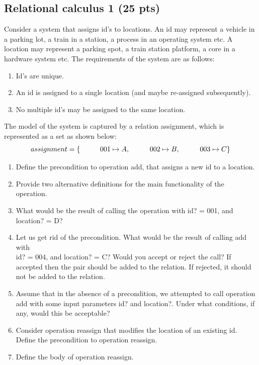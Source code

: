 \documentclass[12pt]{article}
\begin{document}
\subsection{Relational calculus 1 (25 pts)}
Consider a system that assigns id’s to locations. An id may represent a vehicle in a parking
lot, a train in a station, a process in an operating system etc. A location may represent a
parking spot, a train station platform, a core in a hardware system etc. The requirements
of the system are as follows:
\begin{enumerate}
	\item Id’s are unique.
	\item An id is assigned to a single location (and maybe re-assigned subsequently).
	\item No multiple id’s may be assigned to the same location.
\end{enumerate}
The model of the system is captured by a relation assignment, which is represented as a set
as shown below:
\[
assignment = \\
\{ \\
\hspace{10mm} 001 \mapsto A,\\
\hspace{10mm} 002 \mapsto B,\\
\hspace{10mm} 003 \mapsto C\\
\}
\]

\begin{enumerate}
	\item Define the precondition to operation add, that assigns a new id to a location.
	\item Provide two alternative definitions for the main functionality of the operation.
	\item What would be the result of calling the operation with id? = 001, and location? = D?
	\item Let us get rid of the precondition. What would be the result of calling add with\\ id? = 004, and location? = C? Would you accept or reject the call? If accepted then the pair should be added to the relation. If rejected, it should not be added to the relation.
	\item Assume that in the absence of a precondition, we attempted to call operation add with some input parameters id? and location?. Under what conditions, if any, would this be acceptable?
	\item Consider operation reassign that modifies the location of an existing id. Define the precondition to operation reassign.
	\item Define the body of operation reassign.
\end{enumerate}
\newpage
\end{document}

